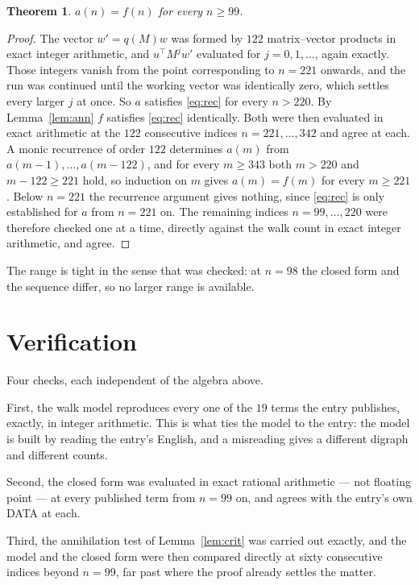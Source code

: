 \documentclass[11pt,a4paper]{article}
\theoremstyle{plain}
\newtheorem{theorem}{Theorem}
\theoremstyle{definition}
\begin{document}
\begin{theorem}
$a(n)=f(n)$ for every $n\ge99$.
\end{theorem}

\begin{proof}
The vector $w'=q(M)w$ was formed by $122$ matrix--vector products in exact integer
arithmetic, and $u^{\!\top}M^{j}w'$ evaluated for $j=0,1,\dots$, again exactly. Those integers
vanish from the point corresponding to $n=221$ onwards, and the run was continued until the
working vector was identically zero, which settles every larger $j$ at once. So $a$ satisfies
\eqref{eq:rec} for every $n>220$. By Lemma~\ref{lem:ann} $f$ satisfies \eqref{eq:rec}
identically. Both were then evaluated in exact arithmetic at the $122$ consecutive indices
$n=221,\dots,342$ and agree at each. A monic recurrence of order $122$
determines $a(m)$ from $a(m-1),\dots,a(m-122)$, and for every $m\ge343$ both
$m>220$ and $m-122\ge221$ hold, so induction on $m$ gives $a(m)=f(m)$ for every
$m\ge221$.
Below $n=221$ the recurrence argument gives nothing, since \eqref{eq:rec} is only
established for $a$ from $n=221$ on. The remaining indices $n=99,\dots,220$ were
therefore checked one at a time, directly against the walk count in exact integer arithmetic,
and agree.
\end{proof}

The range is tight in the sense that was checked: at $n=98$ the closed form and the sequence differ, so no larger range is available.

\section{Verification}

Four checks, each independent of the algebra above.

First, the walk model reproduces every one of the $19$ terms the entry publishes,
exactly, in integer arithmetic. This is what ties the model to the entry: the model is built
by reading the entry's English, and a misreading gives a different digraph and different
counts.

Second, the closed form was evaluated in exact rational arithmetic --- not floating point ---
at every published term from $n=99$ on, and agrees with the entry's own DATA at each.

Third, the annihilation test of Lemma~\ref{lem:crit} was carried out exactly, and the model
and the closed form were then compared directly at sixty consecutive indices beyond
$n=99$, far past where the proof already settles the matter.
\end{document}
